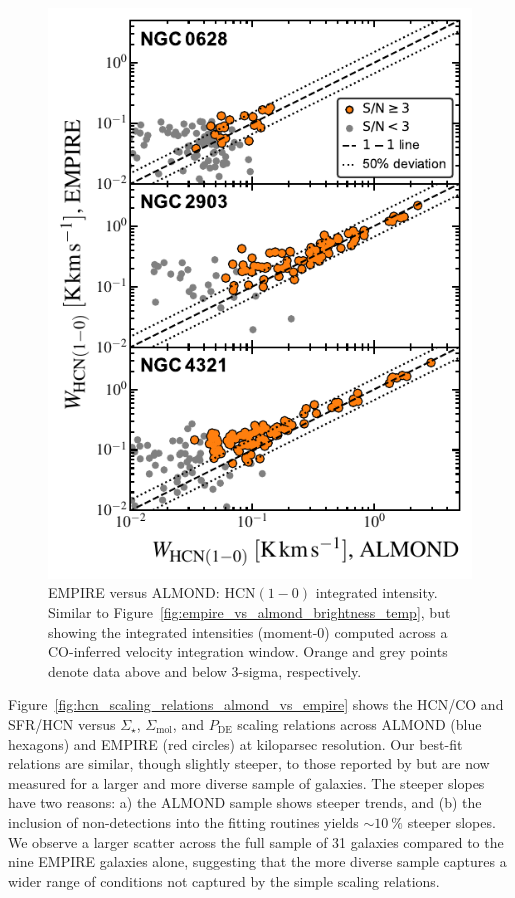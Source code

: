 \documentclass[letter, longauth]{aa} %
\newcommand*{\hcnone}{\ensuremath{\mathrm{HCN(1-0)}}\xspace} %
\newcommand*{\sigmol}{\ensuremath{\Sigma_{\text{mol}}}\xspace}  %
\newcommand*{\pde}{\ensuremath{P_{\text{DE}}}\xspace}  %
\newcommand*{\sigstar}{\ensuremath{\Sigma_{\star}}\xspace}  %
\begin{document}
\begin{appendix}
\begin{figure}
\centering
\includegraphics[width=\columnwidth]{Figures/ALMOND_vs_EMPIRE_integrated_intensities_compressed_v2.pdf}
\caption{EMPIRE versus ALMOND: \hcnone integrated intensity.
Similar to Figure~\ref{fig:empire_vs_almond_brightness_temp}, but showing the integrated intensities (moment-0) computed across a CO-inferred velocity integration window.
Orange and grey points denote data above and below 3-sigma, respectively.
}
\label{fig:empire_vs_almond_intensity}
\end{figure}


Figure~\ref{fig:hcn_scaling_relations_almond_vs_empire} shows the HCN/CO and SFR/HCN versus \sigstar, \sigmol, and \pde scaling relations across ALMOND (blue hexagons) and EMPIRE (red circles) at kiloparsec resolution.
Our best-fit relations are similar, though slightly steeper, to those reported by \citet{Jimenez-Donaire2019} but are now measured for a larger and more diverse sample of galaxies. The steeper slopes have two reasons: a) the ALMOND sample shows steeper trends, and (b) the inclusion of non-detections into the fitting routines yields $\sim\SI{10}{\percent}$ steeper slopes. We observe a larger scatter across the full sample of 31 galaxies compared to the nine EMPIRE galaxies alone, suggesting that the more diverse sample captures a wider range of conditions not captured by the simple scaling relations.


\end{appendix}
\end{document}
